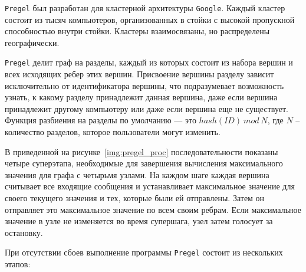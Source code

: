 \texttt{Pregel} был разработан для кластерной архитектуры \texttt{Google}.
Каждый кластер состоит из тысяч компьютеров, организованных в стойки с высокой пропускной способностью внутри стойки. 
Кластеры взаимосвязаны, но распределены географически.

\texttt{Pregel} делит граф на разделы, каждый из которых состоит из набора вершин и всех исходящих ребер этих вершин. 
Присвоение вершины разделу зависит исключительно от идентификатора вершины, что подразумевает возможность узнать, к какому разделу принадлежит данная вершина, даже если вершина принадлежит другому компьютеру или даже если вершина еще не существует. 
Функция разбиения на разделы по умолчанию --- это $hash(ID)\ mod\ N$, где $N$ -- количество разделов, которое пользователи могут изменить.

В приведенной на рисунке~\ref{img:pregel_proc} последовательности показаны четыре суперэтапа, необходимые для завершения вычисления максимального значения для графа с четырьмя узлами. 
На каждом шаге каждая вершина считывает все входящие сообщения и устанавливает максимальное значение для своего текущего значения и тех, которые были ей отправлены. 
Затем он отправляет это максимальное значение по всем своим ребрам. 
Если максимальное значение в узле не изменяется во время супершага, узел затем голосует за остановку.


При отсутствии сбоев выполнение программы \texttt{Pregel} состоит из нескольких этапов:


